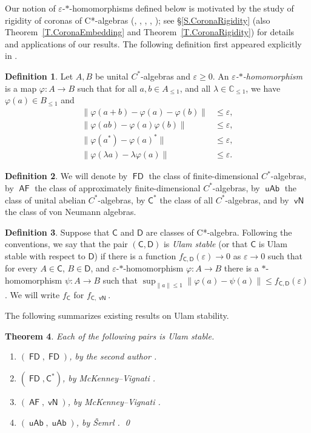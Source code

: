 \documentclass[11pt]{amsproc}
\newcommand{\cstar}{C*}
\newcommand{\cst}{\mathsf{C^*}}
\newcommand{\sfC}{\mathsf C}
\newcommand{\sfD}{\mathsf D}
\DeclareMathOperator{\sfvN}{\mathsf {vN}}
\DeclareMathOperator{\sfAF}{\mathsf {AF}}
\DeclareMathOperator{\sfFD}{\mathsf {FD}}
\DeclareMathOperator{\sfUC}{\mathsf {uAb}}
\theoremstyle{definition}
\newtheorem{definition}{Definition}[section]
\theoremstyle{plain}
\newtheorem{theorem}[definition]{Theorem}
\theoremstyle{remark}
\begin{document}
Our notion of $\varepsilon$-$*$-homomorphisms defined below  is motivated by the study of rigidity of coronas of \cstar-algebras (\cite{Fa:All}, \cite{MV}, \cite{vignati2022rigidity}, \cite[\S 17.2]{FarahCT}, \cite{farah2025corona}); see \S\ref{S.CoronaRigidity} (also Theorem~\ref{T.CoronaEmbedding} and Theorem~\ref{T.CoronaRigidity}) for details and applications of our results.  The following definition first appeared explicitly in \cite[Def.~1.1]{MV}.

\begin{definition}
Let $A,B$ be unital $C^*$-algebras and $\varepsilon\geq0$.
An \emph{$\varepsilon$-$*$-homomorphism} is a map $\varphi\colon A \to B$ such that
for  all $a,b\in A_{\le 1}$, and all $\lambda\in\mathbb C_{\le 1}$, we have $\varphi(a)\in B_{\le 1}$ and
\begin{align*}
\|\varphi(a+b)-\varphi(a)-\varphi(b)\| &\leq \varepsilon,\\
\|\varphi(ab)-\varphi(a)\varphi(b)\| &\leq \varepsilon,\\
\|\varphi(a^*)-\varphi(a)^*\| &\leq \varepsilon,\\
\|\varphi(\lambda a)-\lambda\varphi(a)\| &\leq \varepsilon.
\end{align*}
\end{definition}

\begin{definition}
    We will denote by $\sfFD$ the class of finite-dimensional $C^*$-algebras, by $\sfAF$ the class of approximately finite-dimensional $C^*$-algebras, by $\sfUC$ the class of unital abelian $C^*$-algebras, by $\cst$ the class of all $C^*$-algebras, and by $\sfvN$ the class of von Neumann algebras. 
\end{definition}
\begin{definition}
	Suppose that $\sfC$ and $\sfD$  are classes of \cstar-algebra. Following the conventions,  we say that the pair $(\sfC,\sfD)$ is \emph{Ulam stable} (or that $\sfC$ is Ulam stable with respect to $\sfD$) if there is a function $f_{\sfC,\sfD}(\varepsilon)\to 0$ as $\varepsilon\to 0$ such that for every $A\in \sfC$, $B\in \sfD$, and $\varepsilon$-$*$-homomorphism $\varphi\colon A\to B$ there is a $*$-homomorphism $\psi\colon A\to B$ such that $\sup_{\|a\|\le 1}\|\varphi(a)-\psi(a)\|\le f_{\sfC,\sfD}(\varepsilon)$.
We will write $f_{\sfC}$ for $f_{\sfC,\sfvN}$. 
\end{definition}

The following summarizes existing results on Ulam stability. 
\begin{theorem}\label{thm:MV_AF} Each of the following pairs is Ulam stable. 
\begin{enumerate}
	\item $(\sfFD,\sfFD)$, by the second author \cite{Fa:All}. 
	\item \label{I.MV_fin} $(\sfFD, \cst)$, by McKenney--Vignati \cite{MV}. 
	\item \label{I.MV_AF} $(\sfAF,\sfvN)$, by McKenney--Vignati \cite{MV}. 
	\item \label{I.Semrl} $(\sfUC,\sfUC)$, by \v Semrl \cite{semrl1999non}. \qed 
	\end{enumerate}
\end{theorem}
\end{document}
